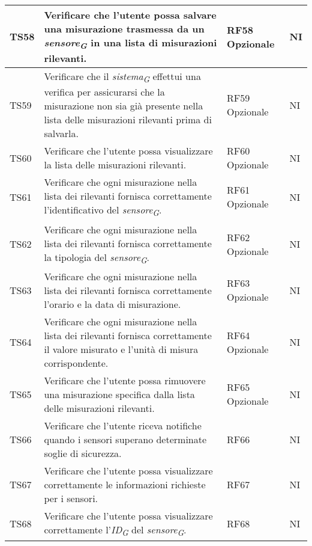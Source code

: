 \begin{longtable}{|C{1.9cm}|L{5cm}|C{2cm}|C{2cm}|}
    TS58 & Verificare che l'utente possa salvare una misurazione trasmessa da un \textit{sensore}\textsubscript{\textit{G}} in una lista di misurazioni rilevanti. & RF58 Opzionale & NI \\
    \hline

    TS59 & Verificare che il \textit{sistema}\textsubscript{\textit{G}} effettui una verifica per assicurarsi che la misurazione non sia già presente nella lista delle misurazioni rilevanti prima di salvarla. & RF59 Opzionale & NI \\
    \hline

    TS60 & Verificare che l'utente possa visualizzare la lista delle misurazioni rilevanti. & RF60 Opzionale & NI \\
    \hline

    TS61 & Verificare che ogni misurazione nella lista dei rilevanti fornisca correttamente l'identificativo del \textit{sensore}\textsubscript{\textit{G}}. & RF61 Opzionale & NI \\
    \hline

    TS62 & Verificare che ogni misurazione nella lista dei rilevanti fornisca correttamente la tipologia del \textit{sensore}\textsubscript{\textit{G}}. & RF62 Opzionale & NI \\
    \hline

    TS63 & Verificare che ogni misurazione nella lista dei rilevanti fornisca correttamente l'orario e la data di misurazione. & RF63 Opzionale & NI \\
    \hline

    TS64 & Verificare che ogni misurazione nella lista dei rilevanti fornisca correttamente il valore misurato e l'unità di misura corrispondente. & RF64 Opzionale & NI \\
    \hline

    TS65 & Verificare che l'utente possa rimuovere una misurazione specifica dalla lista delle misurazioni rilevanti. & RF65 Opzionale & NI \\
    \hline

    TS66 & Verificare che l'utente riceva notifiche quando i sensori superano determinate soglie di sicurezza. & RF66 & NI \\
    \hline

    TS67 & Verificare che l'utente possa visualizzare correttamente le informazioni richieste per i sensori. & RF67 & NI \\
    \hline

    TS68 & Verificare che l'utente possa visualizzare correttamente l'\textit{ID}\textsubscript{\textit{G}} del \textit{sensore}\textsubscript{\textit{G}}. & RF68 & NI \\
    \hline


\end{longtable}

